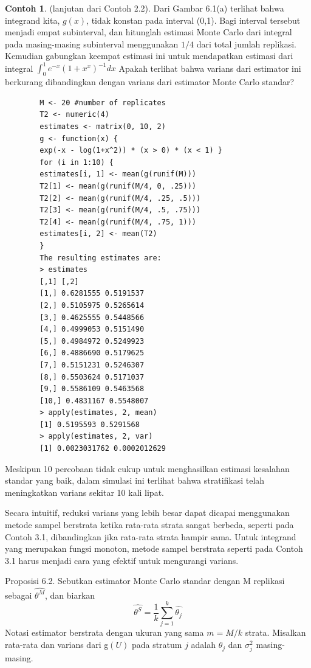 \documentclass[a4paper,12pt]{article}
\theoremstyle{definition}
\newtheorem{example}{Contoh}[section]
\begin{document}
\begin{example}
    (lanjutan dari Contoh 2.2). Dari Gambar 6.1(a) terlihat bahwa integrand kita, $g(x)$, tidak konstan pada interval (0,1). Bagi interval tersebut menjadi empat subinterval, dan hitunglah estimasi Monte Carlo dari integral pada masing-masing subinterval menggunakan $1/4$ dari total jumlah replikasi. Kemudian gabungkan keempat estimasi ini untuk mendapatkan estimasi dari integral $\int_{0}^{1}e^{-x}(1+x^{x})^{-1}dx$ Apakah terlihat bahwa varians dari estimator ini berkurang dibandingkan dengan varians dari estimator Monte Carlo standar?
    \begin{lstlisting}
        M <- 20 #number of replicates
        T2 <- numeric(4)
        estimates <- matrix(0, 10, 2)
        g <- function(x) {
        exp(-x - log(1+x^2)) * (x > 0) * (x < 1) }
        for (i in 1:10) {
        estimates[i, 1] <- mean(g(runif(M)))
        T2[1] <- mean(g(runif(M/4, 0, .25)))
        T2[2] <- mean(g(runif(M/4, .25, .5)))
        T2[3] <- mean(g(runif(M/4, .5, .75)))
        T2[4] <- mean(g(runif(M/4, .75, 1)))
        estimates[i, 2] <- mean(T2)
        }
        The resulting estimates are:
        > estimates
        [,1] [,2]
        [1,] 0.6281555 0.5191537
        [2,] 0.5105975 0.5265614
        [3,] 0.4625555 0.5448566
        [4,] 0.4999053 0.5151490
        [5,] 0.4984972 0.5249923
        [6,] 0.4886690 0.5179625
        [7,] 0.5151231 0.5246307
        [8,] 0.5503624 0.5171037
        [9,] 0.5586109 0.5463568
        [10,] 0.4831167 0.5548007
        > apply(estimates, 2, mean)
        [1] 0.5195593 0.5291568
        > apply(estimates, 2, var)
        [1] 0.0023031762 0.0002012629
    \end{lstlisting}
    Meskipun 10 percobaan tidak cukup untuk menghasilkan estimasi kesalahan standar yang baik, dalam simulasi ini terlihat bahwa stratifikasi telah meningkatkan varians sekitar 10 kali lipat.
    
    Secara intuitif, reduksi varians yang lebih besar dapat dicapai menggunakan metode sampel berstrata ketika rata-rata strata sangat berbeda, seperti pada Contoh 3.1, dibandingkan jika rata-rata strata hampir sama. Untuk integrand yang merupakan fungsi monoton, metode sampel berstrata seperti pada Contoh 3.1 harus menjadi cara yang efektif untuk mengurangi varians.

    Proposisi 6.2. Sebutkan estimator Monte Carlo standar dengan M replikasi sebagai $\widehat{\theta^{M}}$, dan biarkan
    \begin{equation*}
        \widehat{\theta^{S}}=\frac{1}{k}\sum_{j=1}^{k}\widehat{\theta_{j}}
    \end{equation*}
    Notasi estimator berstrata dengan ukuran yang sama $m = M/k$ strata. Misalkan rata-rata dan varians dari g$(U)$ pada stratum $j$ adalah $\theta_{j}$ dan $\sigma ^{2}_{j}$ masing-masing. 
    

\end{example}
\end{document}
